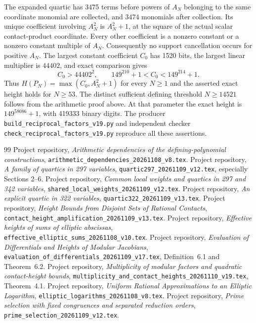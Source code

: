 \documentclass[11pt,a4paper]{article}
\begin{document}
The expanded quartic has 3475 terms before powers of $A_N$ belonging
to the same coordinate monomial are collected, and 3474 monomials
after collection. Its unique coefficient involving $A_N^2$ is
$A_N^2+1$, at the square of the actual scalar contact-product coordinate.
Every other coefficient is a nonzero constant or a nonzero constant
multiple of $A_N$. Consequently no support cancellation occurs for
positive $A_N$. The largest constant coefficient $C_0$ has 1520 bits,
the largest linear multiplier is $44402$, and exact comparison
gives
\[
 C_0>44402^2,\qquad
 149^{210}+1<C_0<149^{214}+1.
\]
Thus $H(P_N)=\max(C_0,A_N^2+1)$ for every $N\ge1$ and the asserted
exact height holds for $N\ge53$. The distinct sufficient defining threshold $N\ge14521$ follows from
the arithmetic proof above. At that parameter the exact height is
$149^{58086}+1$, with 419333 binary digits. The producer
\nolinkurl{build_reciprocal_factors_v19.py} and independent checker
\nolinkurl{check_reciprocal_factors_v19.py} reproduce all these assertions.

\begin{thebibliography}{99}\small\setlength{\itemsep}{2pt}
 Project repository,
\emph{Arithmetic dependencies of the defining-polynomial constructions},
\nolinkurl{arithmetic_dependencies_20261108_v8.tex}.
 Project repository,
\emph{A family of quartics in 297 variables},
\nolinkurl{quartic297_20261109_v12.tex}, especially Sections 2--6.
 Project repository,
\emph{Common local weights and quartics in 297 and 342 variables},
\nolinkurl{shared_local_weights_20261109_v12.tex}.
 Project repository,
\emph{An explicit quartic in 322 variables},
\nolinkurl{quartic322_20261109_v13.tex}.
 Project repository,
\emph{Height Bounds from Disjoint Sets of Rational Contacts},
\nolinkurl{contact_height_amplification_20261109_v13.tex}.
 Project repository,
\emph{Effective heights of sums of elliptic abscissas},
\nolinkurl{effective_elliptic_sums_20261108_v10.tex}.
 Project repository,
\emph{Evaluation of Differentials and Heights of Modular Jacobians},
\nolinkurl{evaluation_of_differentials_20261109_v17.tex},
Definition~6.1 and Theorem~6.2.
 Project repository,
\emph{Multiplicity of modular factors and quadratic contact-height bounds},
\nolinkurl{multiplicity_and_contact_heights_20261110_v19.tex},
Theorem~4.1.
 Project repository,
\emph{Uniform Rational Approximations to an Elliptic Logarithm},
\nolinkurl{elliptic_logarithms_20261108_v8.tex}.
 Project repository,
\emph{Prime selection with fixed congruences and separated reduction orders},
\nolinkurl{prime_selection_20261109_v12.tex}.
\end{thebibliography}
\end{document}
